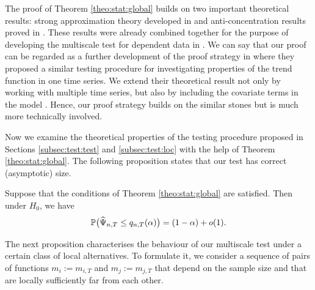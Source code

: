\documentclass[a4paper,12pt]{article}
\makeatletter
\renewcommand{\eqref}[1]{\tagform@{\ref{#1}}}
\newcommand{\doublehattwo}[1]{\widehat{\widehat{#1}}}
\makeatother
\begin{document}

\begin{remark}
The proof of Theorem \ref{theo:stat:global} builds on two important theoretical results: strong approximation theory developed in \cite{BerkesLiuWu2014} and anti-concentration results proved in \cite{Chernozhukov2015}. These results were already combined together for the purpose of developing the multiscale test for dependent data in \cite{KhismatullinaVogt2020}. We can say that our proof can be regarded as a further development of the proof strategy in \cite{KhismatullinaVogt2020} where they proposed a similar testing procedure for investigating properties of the trend function in one time series. We extend their theoretical result not only by working with multiple time series, but also by including the covariate terms in the model \eqref{eq:model}. Hence, our proof strategy builds on the similar stones but is much more technically involved.
\end{remark}

Now we examine the theoretical properties of the testing procedure proposed in \linebreak Sections \ref{subsec:test:test} and \ref{subsec:test:loc} with the help of Theorem \ref{theo:stat:global}. The following proposition 
states that our test has correct (asymptotic) size.

\begin{prop}\label{prop:test}
Suppose that the conditions of Theorem \ref{theo:stat:global} are satisfied. Then under $H_0$, we have
\[ \mathbb{P} \big( \widehat{\Psi}_{n,T} \le q_{n,T}(\alpha) \big) = (1 - \alpha) + o(1). \]
\end{prop}

The next proposition characterises the behaviour of our multiscale test under a certain class of local alternatives. To formulate it, we consider a sequence of pairs of functions $m_ i := m_{i,T}$ and $m_ j := m_{j,T}$ that depend on the sample size and that are locally sufficiently far from each other.
\end{document}
